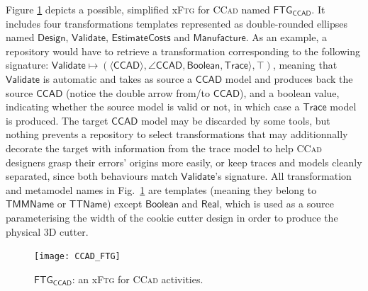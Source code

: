 Figure \ref{fig:CCAD-FTG} depicts a possible, simplified x\textsc{Ftg} for 
\textsc{CCad} named $\mathsf{FTG_{CCAD}}$. It includes four transformations 
templates represented as double-rounded ellipses named $\mathsf{Design}$, 
$\mathsf{Validate}$, $\mathsf{EstimateCosts}$ and $\mathsf{Manufacture}$. As an 
example, a repository would have to retrieve a transformation corresponding to
the following signature: $\mathsf{Validate} \mapsto 
(\langle\mathsf{CCAD}\rangle, \angle \mathsf{CCAD}, \mathsf{Boolean}, 
\mathsf{Trace}\rangle, \top)$, meaning that $\mathsf{Validate}$ is automatic and 
takes as source a $\mathsf{CCAD}$ model and produces back the source 
$\mathsf{CCAD}$ (notice the double arrow from/to $\mathsf{CCAD}$), and a 
boolean value, indicating whether the source model is valid or not, in which 
case a $\mathsf{Trace}$ model is produced. The target $\mathsf{CCAD}$ model may 
be discarded by some tools, but nothing prevents a repository to select 
transformations that may additionnally decorate the target with information 
from the trace model to help \textsc{CCad} designers grasp their errors' 
origins more easily, or keep traces and models cleanly separated, since both 
behaviours match $\mathsf{Validate}$'s signature. All transformation and 
metamodel names in Fig.~\ref{fig:CCAD-FTG} are templates (meaning they belong 
to $\mathsf{TMMName}$ or $\mathsf{TTName}$) except $\mathsf{Boolean}$ and 
$\mathsf{Real}$, which is used as a source parameterising the width of the 
cookie cutter design in order to produce the physical 3D cutter.

\begin{figure}[t]
   \centering
   \texttt{[image: CCAD\_FTG]}
   \caption{$\mathsf{FTG_{CCAD}}$: an x\textsc{Ftg} for \textsc{CCad} 
activities.}%
   \label{fig:CCAD-FTG}%
\end{figure}

